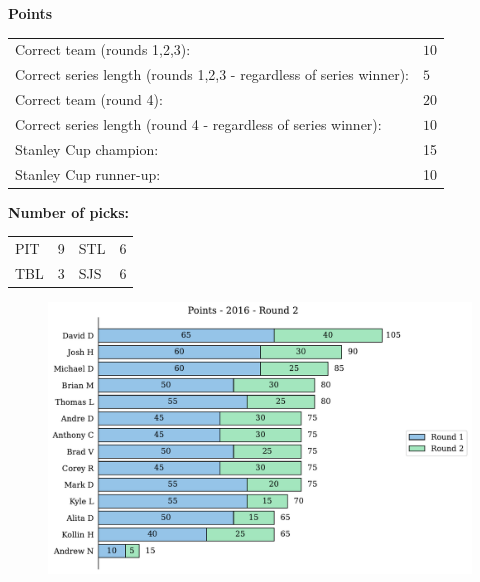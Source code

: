 \documentclass[10pt]{article}
\begin{document}
{\bf Points}\\
\begin{minipage}{12cm}
    \begin{tabular}{l l}
        Correct team (rounds 1,2,3):	& $10$\\
        Correct series length (rounds 1,2,3 - regardless of series winner):	& $5$\\
        Correct team (round 4):	& $20$\\
        Correct series length (round 4 - regardless of series winner):	& $10$\\
        Stanley Cup champion:	& 15\\
        Stanley Cup runner-up:	& 10\\
    \end{tabular}

    \vspace{0.5cm}
    {\bf Number of picks:}\\
    \begin{tabular}{lc | lc }
        PIT & 9 & STL & 6 \\
        TBL & 3 & SJS & 6 \\
    \end{tabular}
\end{minipage}
\begin{minipage}[t]{13cm}
    \begin{figure}[H]
        \vspace{-3.5cm}
        \includegraphics[width=12cm]{../../figures/2016/Points-2016-Round2.pdf}
    \end{figure}
\end{minipage}
\end{document}
